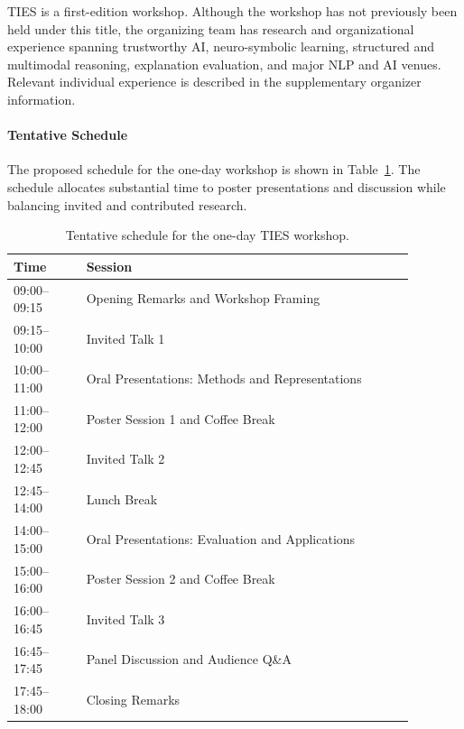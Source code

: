 \documentclass[11pt]{article}
\begin{document}
TIES is a first-edition workshop. Although the workshop has not
previously been held under this title, the organizing team has research
and organizational experience spanning trustworthy AI,
neuro-symbolic learning, structured and multimodal reasoning,
explanation evaluation, and major NLP and AI venues. Relevant
individual experience is described in the supplementary organizer
information.

\paragraph{Tentative Schedule}

The proposed schedule for the one-day workshop is shown in
Table~\ref{tab:ties-schedule}. The schedule allocates substantial time
to poster presentations and discussion while balancing invited and
contributed research.

\begin{table}[t]
    \small
    \centering
    \renewcommand{\arraystretch}{1.08}
    \begin{tabular}{p{0.16\linewidth}p{0.72\linewidth}}
        \toprule
        Time & Session \\
        \midrule
        09:00--09:15 & Opening Remarks and Workshop Framing \\
        09:15--10:00 & Invited Talk 1 \\
        10:00--11:00 & Oral Presentations: Methods and Representations \\
        11:00--12:00 & Poster Session 1 and Coffee Break \\
        12:00--12:45 & Invited Talk 2 \\
        12:45--14:00 & Lunch Break \\
        14:00--15:00 & Oral Presentations: Evaluation and Applications \\
        15:00--16:00 & Poster Session 2 and Coffee Break \\
        16:00--16:45 & Invited Talk 3 \\
        16:45--17:45 & Panel Discussion and Audience Q\&A \\
        17:45--18:00 & Closing Remarks \\
        \bottomrule
    \end{tabular}
    \caption{Tentative schedule for the one-day TIES workshop.}
    \label{tab:ties-schedule}
\end{table}

\end{document}
